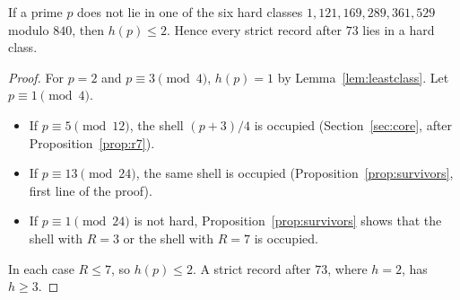 \begin{corollary}\label{cor:hle2}
If a prime $p$ does not lie in one of the six hard classes $1,121,169,289,361,529$ modulo $840$, then $h(p)\le2$. Hence every strict record after $73$ lies in a hard class.
\end{corollary}
\begin{proof}
For $p=2$ and $p\equiv3\pmod4$, $h(p)=1$ by Lemma~\ref{lem:leastclass}. Let $p\equiv1\pmod4$.
\begin{itemize}
\item If $p\equiv5\pmod{12}$, the shell $(p+3)/4$ is occupied (Section~\ref{sec:core}, after Proposition~\ref{prop:r7}).
\item If $p\equiv13\pmod{24}$, the same shell is occupied (Proposition~\ref{prop:survivors}, first line of the proof).
\item If $p\equiv1\pmod{24}$ is not hard, Proposition~\ref{prop:survivors} shows that the shell with $R=3$ or the shell with $R=7$ is occupied.
\end{itemize}
In each case $R\le7$, so $h(p)\le2$. A strict record after $73$, where $h=2$, has $h\ge3$.
\end{proof}


